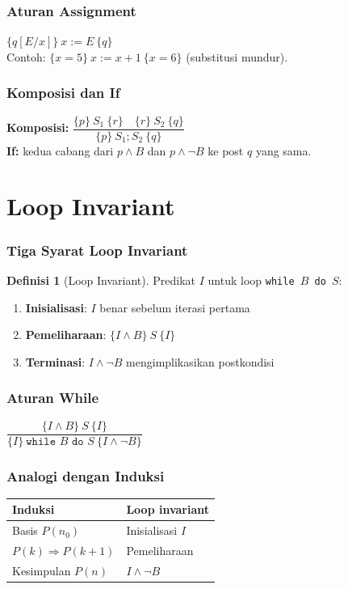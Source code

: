 \documentclass[handout]{beamer}
\theoremstyle{definition}
\newtheorem{definisi}[theorem]{Definisi}
\theoremstyle{example}
\begin{document}
\begin{frame}
\frametitle{Aturan Assignment}
$\{q[E/x]\}\ x := E\ \{q\}$\\
Contoh: $\{x = 5\}\ x := x+1\ \{x = 6\}$ (substitusi mundur).
\end{frame}

\begin{frame}
\frametitle{Komposisi dan If}
\textbf{Komposisi:} $\dfrac{\{p\}\ S_1\ \{r\} \quad \{r\}\ S_2\ \{q\}}{\{p\}\ S_1; S_2\ \{q\}}$\\
\textbf{If:} kedua cabang dari $p \wedge B$ dan $p \wedge \neg B$ ke post $q$ yang sama.
\end{frame}

\section{Loop Invariant}

\begin{frame}
\frametitle{Tiga Syarat Loop Invariant}
\begin{definisi}[Loop Invariant]
Predikat $I$ untuk loop \texttt{while $B$ do $S$}:
\begin{enumerate}
  \item \textbf{Inisialisasi}: $I$ benar sebelum iterasi pertama
  \item \textbf{Pemeliharaan}: $\{I \wedge B\}\ S\ \{I\}$
  \item \textbf{Terminasi}: $I \wedge \neg B$ mengimplikasikan postkondisi
\end{enumerate}
\end{definisi}
\end{frame}

\begin{frame}
\frametitle{Aturan While}
$\dfrac{\{I \wedge B\}\ S\ \{I\}}{\{I\}\ \texttt{while } B \texttt{ do } S\ \{I \wedge \neg B\}}$
\end{frame}

\begin{frame}
\frametitle{Analogi dengan Induksi}
\begin{center}
\small
\begin{tabular}{|l|l|}
\hline
\textbf{Induksi} & \textbf{Loop invariant} \\ \hline
Basis $P(n_0)$ & Inisialisasi $I$ \\ \hline
$P(k) \Rightarrow P(k+1)$ & Pemeliharaan \\ \hline
Kesimpulan $P(n)$ & $I \wedge \neg B$ \\ \hline
\end{tabular}
\end{center}
\end{frame}
\end{document}
